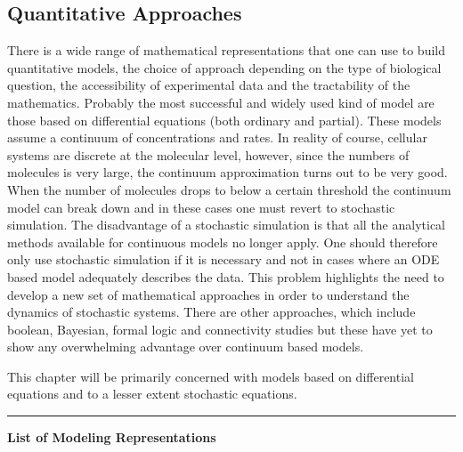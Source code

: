 \documentclass[]{article}
\begin{document}
\subsection{Quantitative Approaches}

There is a wide range of mathematical representations that one can use
to build quantitative models, the choice of approach depending on the
type of biological question, the accessibility of experimental data and
the tractability of the mathematics. Probably the most successful and
widely used kind of model are those based on differential equations
(both ordinary and partial). These models assume a continuum of
concentrations and rates. In reality of course, cellular systems are
discrete at the molecular level, however, since the numbers of molecules
is very large, the continuum approximation turns out to be very good.
When the number of molecules drops to below a certain threshold the
continuum model can break down and in these cases one must revert to
stochastic simulation. The disadvantage of a stochastic simulation is
that all the analytical methods available for continuous models no
longer apply. One should therefore only use stochastic simulation if it
is necessary and not in cases where an ODE based model adequately
describes the data. This problem highlights the need to develop a new
set of mathematical approaches in order to understand the dynamics of
stochastic systems. There are other approaches, which include boolean,
Bayesian, formal logic and connectivity studies but these have yet to
show any overwhelming advantage over continuum based models.

This chapter will be primarily concerned with models based on
differential equations and to a lesser extent stochastic equations.

\begin{center}\rule{3in}{0.4pt}\end{center}

\textbf{List of Modeling Representations}
\end{document}
